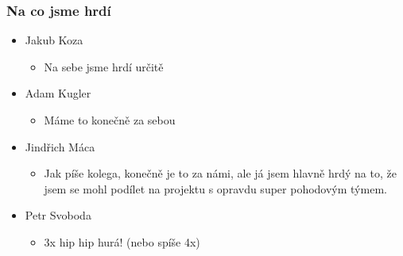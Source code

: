\documentclass{beamer}
\begin{document}

\begin{frame}[allowframebreaks]\frametitle{Na co jsme hrdí} 
  \begin{itemize}
    \item Jakub Koza
      \begin{itemize}
       \item Na sebe jsme hrdí určitě
     \end{itemize}
   
    \item Adam Kugler
      \begin{itemize}
       \item Máme to konečně za sebou
     \end{itemize}

    \item Jindřich Máca
      \begin{itemize}
       \item Jak píše kolega, konečně je to za námi, ale já jsem hlavně hrdý na to, že jsem se mohl podílet na projektu s opravdu super pohodovým týmem.
      \end{itemize}  
   
    \item Petr Svoboda
      \begin{itemize}
       \item 3x hip hip hurá! (nebo spíše 4x)
     \end{itemize}
   \end{itemize}  
\end{frame}

   
\end{document}
